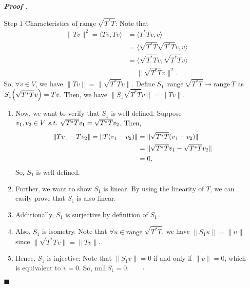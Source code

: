 \documentclass[11pt, letterpaper]{article}
\newcounter{nprf}[subsection]
\newenvironment*{prf}{\par\indent\textbf{\textit{Proof \stepcounter{nprf}\thenprf.}}}{\hfill$\blacksquare$\par}
\def\st{\emph{ s.t. }}
\def\pqde{\qquad\square}
\def\Null{\mathrm{null\ }}
\def\range{\mathrm{range\ }}
\begin{document}
\begin{prf}
	\par $\boxed{\text{Step }1}$ Characteristics of $\range\sqrt{T^*T}$: Note that \[\begin{aligned}\|Tv\|^2=\langle Tv,Tv\rangle&=\langle T^*Tv,v\rangle\\&=\langle\sqrt{T^*T}\sqrt{T^*T}v,v\rangle\\&=\langle\sqrt{T^*T}v,\sqrt{T^*T}v\rangle\\&=\|\sqrt{T^*T}v\|^2.\end{aligned}\] So, $\forall v\in V$, we have $\|Tv\|=\|\sqrt{T^*T}v\|$. Define $S_1:\range\sqrt{T^*T}\to\range T$ as $S_1\qty(\sqrt{T^*T}v)=Tv$. Then, we have $\|S_1\sqrt{T^*T}v\|=\|Tv\|$.
	\begin{enumerate}
		\item Now, we want to verify that $S_1$ is well-defined. Suppose $v_1,v_2\in V\st\sqrt{T^*T}v_1=\sqrt{T^*T}v_2$. Then, \[\begin{aligned}\|Tv_1-Tv_2\|=\|T\qty(v_1-v_2)\|&=\|\sqrt{T^*T}\qty(v_1-v_2)\|\\&=\|\sqrt{T^*T}v_1-\sqrt{T^*T}v_2\|\\&=0.\end{aligned}\] So, $S_1$ is well-defined. 
		\item Further, we want to show $S_1$ is linear. By using the linearity of $T$, we can easily prove that $S_1$ is also linear.
		\item Additionally, $S_1$ is surjective by definition of $S_1$.
		\item Also, $S_1$ is isometry. Note that $\forall u\in\range\sqrt{T^*T}$, we have $\|S_1u\|=\|u\|$ since $\|\sqrt{T^*T}v\|=\|Tv\|$.
		\item Hence, $S_1$ is injective: Note that $\|S_1v\|=0$ if and only if $\|v\|=0$, which is equivalent to $v=0$. So, $\Null S_1=\qty{0}.\pqde$
	\end{enumerate}

\end{prf}
\end{document}

